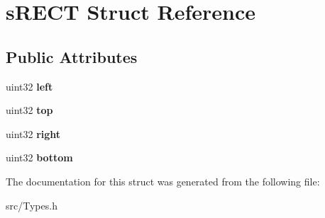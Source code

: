 \section{sRECT Struct Reference}
\label{structsRECT}
\subsection*{Public Attributes}
\begin{DoxyCompactItemize}
\item 
uint32 {\bfseries left}\label{structsRECT_afc7704bee77175a3159911cead8194f1}

\item 
uint32 {\bfseries top}\label{structsRECT_a84c7bd422198ec675bcc8ec669439f9e}

\item 
uint32 {\bfseries right}\label{structsRECT_a3f1e5b0f3aec1e903e69c4e785b2584a}

\item 
uint32 {\bfseries bottom}\label{structsRECT_a2e89e42aab0a476464bc2eefee183176}

\end{DoxyCompactItemize}


The documentation for this struct was generated from the following file:\begin{DoxyCompactItemize}
\item 
src/Types.h\end{DoxyCompactItemize}
